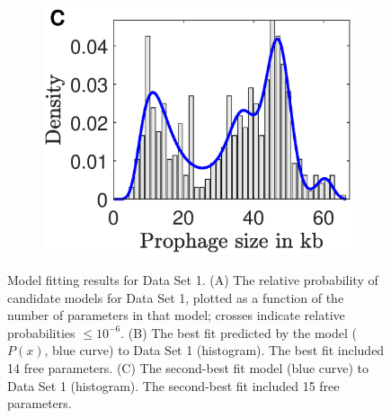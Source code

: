 \begin{figure}[H]
\begin{subfigure}[t]{0.3\textwidth}
\includegraphics[scale=0.4]{bob_best2_pdf.eps}
 \end{subfigure}\hfill
\caption[Model fitting results for Data Set 1.]{ Model fitting results for Data Set 1.  (A) The relative probability of candidate models for Data Set 1, plotted as a function of the number of parameters in that model; crosses indicate relative probabilities $\leq 10^{-6}$. (B) The best fit predicted by the model ($P(x)$, blue curve) to Data Set 1 (histogram). The best fit included 14 free parameters. (C) The second-best fit  model (blue curve) to Data Set 1 (histogram). The second-best fit included 15 free parameters.}
\end{figure}
